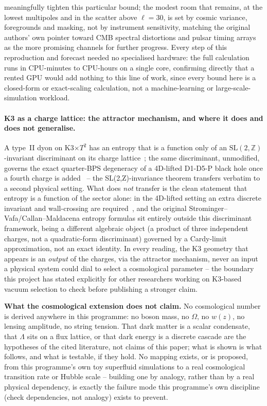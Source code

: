 \documentclass[11pt,a4paper]{article}
\begin{document}
meaningfully tighten this particular bound; the modest room that remains, at the lowest multipoles and
in the scatter above $\ell=30$, is set by cosmic variance, foregrounds and masking, not by instrument
sensitivity, matching the original authors'
own pointer toward CMB spectral distortions and pulsar timing arrays as the more promising channels for
further progress. Every step of this reproduction and forecast needed no specialised hardware: the full
calculation runs in CPU-minutes to CPU-hours on a single core, confirming directly that a rented GPU
would add nothing to this line of work, since every bound here is a closed-form or exact-scaling
calculation, not a machine-learning or large-scale-simulation workload.

\paragraph{K3 as a charge lattice: the attractor mechanism, and where it does and does not generalise.}
A type~II dyon on K3$\times T^2$ has an entropy that is a function only of an
$\mathrm{SL}(2,\mathbb Z)$-invariant discriminant on its charge lattice~\cite{Moore1998}; the same
discriminant, unmodified, governs the exact quarter-BPS degeneracy of a 4D-lifted D1-D5-P black hole
once a fourth charge is added~\cite{Sen2008review} -- the SL(2,Z)-invariance theorem transfers verbatim
to a second physical setting. What does \emph{not} transfer is the clean statement that entropy is a
function of the sector alone: in the 4D-lifted setting an extra discrete invariant and wall-crossing
are required~\cite{Sen2007dyon}, and the original Strominger--Vafa/Callan--Maldacena entropy formulas
sit entirely outside this discriminant framework, being a different algebraic object (a product of
three independent charges, not a quadratic-form discriminant) governed by a Cardy-limit approximation,
not an exact identity. In every reading, the K3 geometry that appears is an \emph{output} of the
charges, via the attractor mechanism, never an input a physical system could dial to select a
cosmological parameter -- the boundary this project has stated explicitly for other researchers working
on K3-based vacuum selection to check before publishing a stronger claim.

\begin{failbox}
\textbf{What the cosmological extension does not claim.} No cosmological number is derived anywhere in
this programme: no boson mass, no $\Omega$, no $w(z)$, no lensing amplitude, no string tension. That
dark matter is a scalar condensate, that $\Lambda$ sits on a flux lattice, or that dark energy is a
discrete cascade are the hypotheses of the cited literature, not claims of this paper; what is shown is
what follows, and what is testable, if they hold. No mapping exists, or is proposed, from this
programme's own toy superfluid simulations to a real cosmological transition rate or Hubble scale --
building one by analogy, rather than by a real physical dependency, is exactly the failure mode this
programme's own discipline (check dependencies, not analogy) exists to prevent.
\end{failbox}
\end{document}

